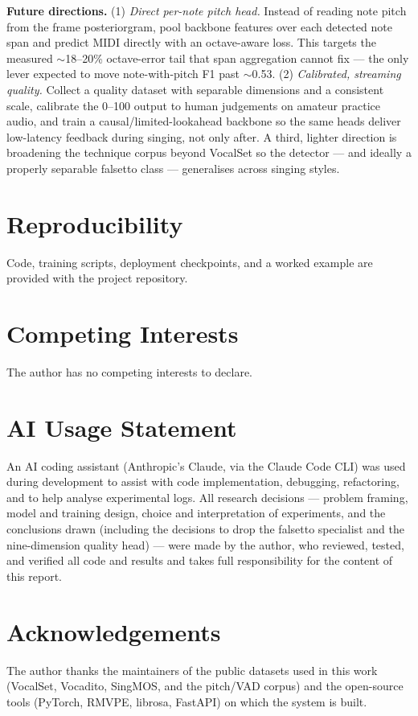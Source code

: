 \documentclass{article}
\begin{document}
\textbf{Future directions.} (1) \emph{Direct per-note pitch head.} Instead of reading
note pitch from the frame posteriorgram, pool backbone features over each detected note
span and predict MIDI directly with an octave-aware loss. This targets the measured
$\sim$18--20\% octave-error tail that span aggregation cannot fix --- the only lever
expected to move note-with-pitch F1 past $\sim$0.53. (2) \emph{Calibrated, streaming
quality.} Collect a quality dataset with separable dimensions and a consistent scale,
calibrate the 0--100 output to human judgements on amateur practice audio, and train a
causal/limited-lookahead backbone so the same heads deliver low-latency feedback during
singing, not only after. A third, lighter direction is broadening the technique corpus
beyond VocalSet so the detector --- and ideally a properly separable falsetto class ---
generalises across singing styles.


\section*{Reproducibility} 
Code, training scripts, deployment checkpoints, and a worked example are provided with the project
repository.

\section*{Competing Interests}
The author has no competing interests to declare.

\section*{AI Usage Statement}
An AI coding assistant (Anthropic's Claude, via the Claude Code CLI) was used during
development to assist with code implementation, debugging, refactoring, and to help analyse experimental logs. 
All research decisions --- problem framing, model and training design, choice and interpretation of experiments,
and the conclusions drawn (including the decisions to drop the falsetto specialist and
the nine-dimension quality head) --- were made by the author, who reviewed, tested,
and verified all code and results and takes full responsibility for the content of
this report.

\section*{Acknowledgements}
The author thanks the maintainers of the public datasets used in this work (VocalSet,
Vocadito, SingMOS, and the pitch/VAD corpus) and the open-source tools (PyTorch, RMVPE,
librosa, FastAPI) on which the system is built.


\end{document}
